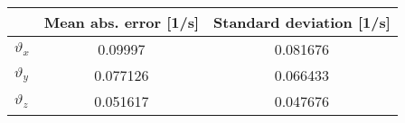 \begin{tabular}{l|cc}
\hline
~ & Mean abs. error [1/s] & Standard deviation [1/s] \\ \hline
$\vartheta_x$ & 0.09997 & 0.081676 \\
$\vartheta_y$ & 0.077126 & 0.066433 \\
$\vartheta_z$ & 0.051617 & 0.047676 \\ \hline

\end{tabular}
